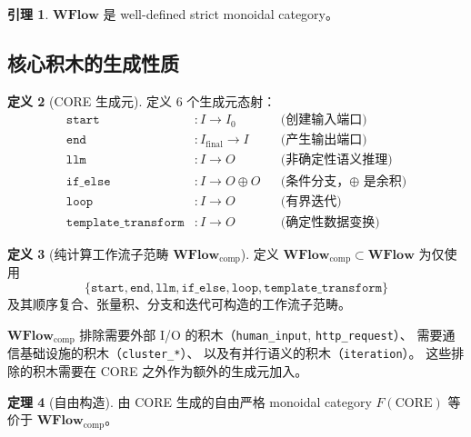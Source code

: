 \documentclass[11pt,a4paper]{article}
\theoremstyle{definition}
\newtheorem{theorem}{定理}[section]
\newtheorem{lemma}[theorem]{引理}
\theoremstyle{definition}
\newtheorem{definition}[theorem]{定义}
\theoremstyle{remark}
\newcommand{\cat}[1]{\mathbf{#1}}
\newcommand{\catWFlow}{\cat{WFlow}}
\begin{document}
\begin{lemma}
$\catWFlow$ 是 well-defined strict monoidal category。
\end{lemma}

\subsection{核心积木的生成性质}

\begin{definition}[CORE 生成元]
定义 6 个生成元态射：
\[
\begin{aligned}
\mathtt{start}&: I \to I_0                  &&\text{(创建输入端口)} \\
\mathtt{end}&: I_{\mathrm{final}} \to I     &&\text{(产生输出端口)} \\
\mathtt{llm}&: I \to O                      &&\text{(非确定性语义推理)} \\
\mathtt{if\_else}&: I \to O \oplus O        &&\text{(条件分支，$\oplus$ 是余积)} \\
\mathtt{loop}&: I \to O                     &&\text{(有界迭代)} \\
\mathtt{template\_transform}&: I \to O      &&\text{(确定性数据变换)}
\end{aligned}
\]
\end{definition}

\begin{definition}[纯计算工作流子范畴 $\catWFlow_{\mathrm{comp}}$]
定义 $\catWFlow_{\mathrm{comp}} \subset \catWFlow$ 为仅使用
\[
\{\mathtt{start}, \mathtt{end}, \mathtt{llm}, \mathtt{if\_else}, \mathtt{loop}, \mathtt{template\_transform}\}
\]
及其顺序复合、张量积、分支和迭代可构造的工作流子范畴。

$\catWFlow_{\mathrm{comp}}$ 排除需要外部 I/O 的积木（\texttt{human\_input}, \texttt{http\_request}）、
需要通信基础设施的积木（\texttt{cluster\_*}）、
以及有并行语义的积木（\texttt{iteration}）。
这些排除的积木需要在 CORE 之外作为额外的生成元加入。
\end{definition}

\begin{theorem}[自由构造]
由 CORE 生成的自由严格 monoidal category $F(\mathrm{CORE})$ 等价于 $\catWFlow_{\mathrm{comp}}$。
\label{thm:free-construction}
\end{theorem}
\end{document}
